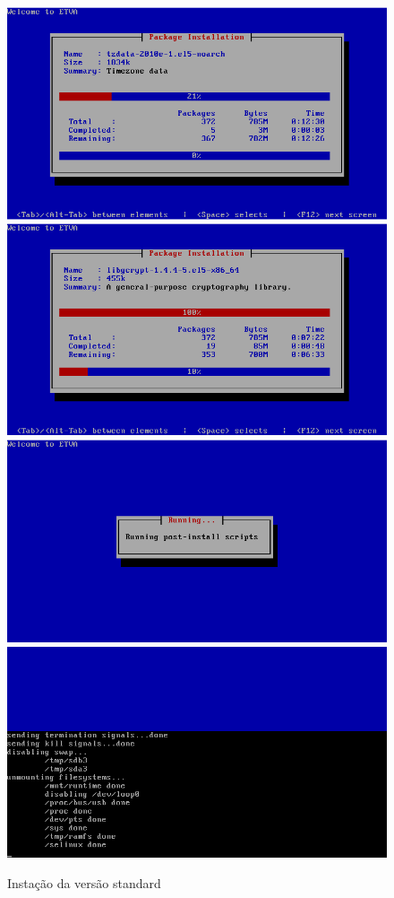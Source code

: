 \begin{figure}[H]
\begin{center}
    \includegraphics[scale=0.4]{screenshots/install_etva6.png}        
    \includegraphics[scale=0.4]{screenshots/install_etva8.png}
    \includegraphics[scale=0.4]{screenshots/install_etva9.png}
    \includegraphics[scale=0.4]{screenshots/install_etva10.png}
\caption{Instação da versão standard}
	\label{fig:installation_standard}
	\end{center}
\end{figure}

